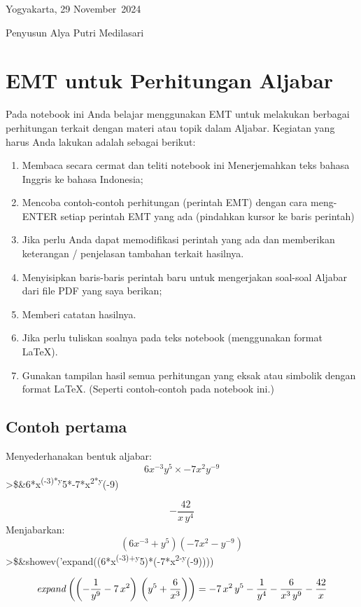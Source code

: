 \documentclass[
]{book}
\providecommand{\tightlist}{%
  \setlength{\itemsep}{0pt}\setlength{\parskip}{0pt}}
\begin{document}
Yogyakarta, 29 November~2024

Penyusun Alya Putri Medilasari

\chapter{EMT untuk Perhitungan Aljabar}\label{emt-untuk-perhitungan-aljabar}

Pada notebook ini Anda belajar menggunakan EMT untuk melakukan berbagai perhitungan terkait dengan materi atau topik dalam Aljabar. Kegiatan yang harus Anda lakukan adalah sebagai berikut:

\begin{enumerate}
\def\labelenumi{\arabic{enumi}.}
\tightlist
\item
  Membaca secara cermat dan teliti notebook ini Menerjemahkan teks bahasa Inggris ke bahasa Indonesia;
\item
  Mencoba contoh-contoh perhitungan (perintah EMT) dengan cara meng-ENTER setiap perintah EMT yang ada (pindahkan kursor ke baris perintah)
\item
  Jika perlu Anda dapat memodifikasi perintah yang ada dan memberikan keterangan / penjelasan tambahan terkait hasilnya.
\item
  Menyisipkan baris-baris perintah baru untuk mengerjakan soal-soal Aljabar dari file PDF yang saya berikan;
\item
  Memberi catatan hasilnya.
\item
  Jika perlu tuliskan soalnya pada teks notebook (menggunakan format LaTeX).
\item
  Gunakan tampilan hasil semua perhitungan yang eksak atau simbolik dengan format LaTeX. (Seperti contoh-contoh pada notebook ini.)
\end{enumerate}

\section{Contoh pertama}\label{contoh-pertama}

Menyederhanakan bentuk aljabar: \[6x^{-3}y^5\times -7x^2y^{-9}\]\textgreater\$\&6*x\textsuperscript{(-3)*y}5*-7*x\textsuperscript{2*y}(-9)

\[-\frac{42}{x\,y^4}\]Menjabarkan: \[(6x^{-3}+y^5)(-7x^2-y^{-9})\] \textgreater\$\&showev('expand((6*x\textsuperscript{(-3)+y}5)*(-7*x\textsuperscript{2-y}(-9))))

\[{\it expand}\left(\left(-\frac{1}{y^9}-7\,x^2\right)\,\left(y^5+  \frac{6}{x^3}\right)\right)=-7\,x^2\,y^5-\frac{1}{y^4}-\frac{6}{x^3  \,y^9}-\frac{42}{x}\]
\end{document}
